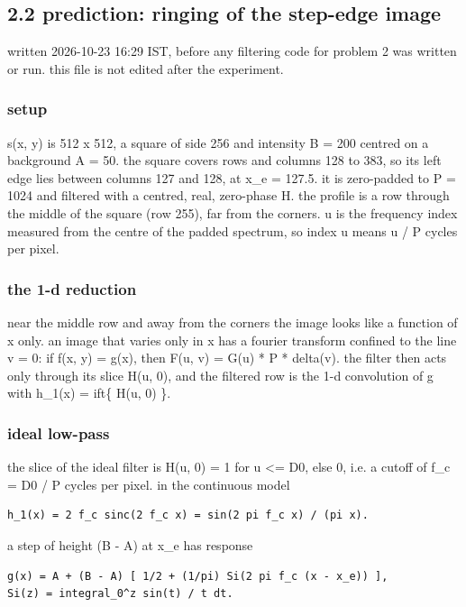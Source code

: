 \subsection{2.2 prediction: ringing of the step-edge image}\label{app:pred-ringing}

written 2026-10-23 16:29 IST, before any filtering code for problem 2 was written or run. this file is not edited after the experiment.

\subsubsection*{setup}

s(x, y) is 512 x 512, a square of side 256 and intensity B = 200 centred on a background A = 50. the square covers rows and columns 128 to 383, so its left edge lies between columns 127 and 128, at x\_e = 127.5. it is zero-padded to P = 1024 and filtered with a centred, real, zero-phase H. the profile is a row through the middle of the square (row 255), far from the corners. u is the frequency index measured from the centre of the padded spectrum, so index u means u / P cycles per pixel.

\subsubsection*{the 1-d reduction}

near the middle row and away from the corners the image looks like a function of x only. an image that varies only in x has a fourier transform confined to the line v = 0: if f(x, y) = g(x), then F(u, v) = G(u) * P * delta(v). the filter then acts only through its slice H(u, 0), and the filtered row is the 1-d convolution of g with h\_1(x) = ift\{ H(u, 0) \}.

\subsubsection*{ideal low-pass}

the slice of the ideal filter is H(u, 0) = 1 for \textbar{}u\textbar{} \textless{}= D0, else 0, i.e. a cutoff of f\_c = D0 / P cycles per pixel. in the continuous model

\begin{verbatim}
h_1(x) = 2 f_c sinc(2 f_c x) = sin(2 pi f_c x) / (pi x).
\end{verbatim}

a step of height (B - A) at x\_e has response

\begin{verbatim}
g(x) = A + (B - A) [ 1/2 + (1/pi) Si(2 pi f_c (x - x_e)) ],
Si(z) = integral_0^z sin(t) / t dt.
\end{verbatim}


